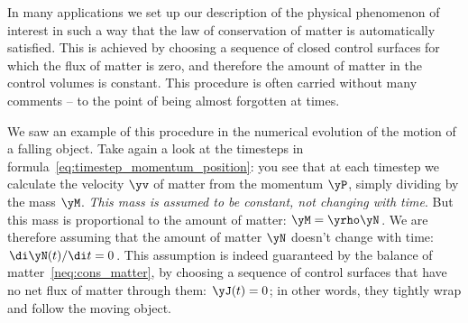 \label{nsec:cons_matter_particle}

In many applications we set up our description of the physical phenomenon of interest in such a way that the law of conservation of matter is automatically satisfied. This is achieved by choosing a sequence of closed control surfaces for which the flux of matter is zero, and therefore the amount of matter in the control volumes is constant. This procedure is often carried without many comments -- to the point of being almost forgotten at times.

We saw an example of this procedure in the {numerical evolution of the motion of a falling object}.
%
Take again a look at the timesteps in formula~\eqref{eq:timestep_momentum_position}: you see that at each timestep we calculate the velocity $\yv$ of matter from the momentum $\yP$, simply dividing by the mass $\yM$. \emph{This mass is assumed to be constant, not changing with time}. But this mass is proportional to the amount of matter: $\yM = \yrho \yN$. We are therefore assuming that the amount of matter $\yN$ doesn't change with time: $\di\yN(t)/\di t = 0$. This assumption is indeed guaranteed by the balance of matter~\eqref{neq:cons_matter}, by choosing a sequence of control surfaces that have no net flux of matter through them: $\yJ(t)=0$; in other words, they tightly wrap and follow the moving object.


\label{nsec:cons_matter_chemistry}

